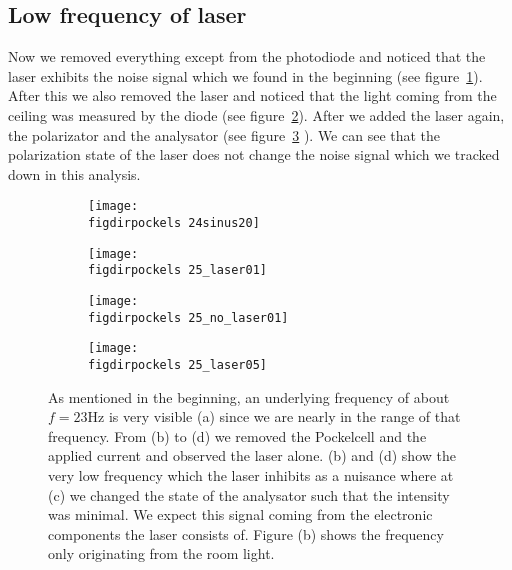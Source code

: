 \subsection{Low frequency of laser}\label{sec:laser}
Now we removed everything except from the photodiode and noticed that
the laser exhibits the noise signal which we found in the beginning
(see figure~\ref{fig:laser_a}). After this we also removed the
laser and noticed that the light coming from the ceiling was 
measured by the diode (see figure~\ref{fig:laser_b}).
After we added the laser again, the polarizator and the analysator
(see figure~\ref{fig:laser_f} ).
We can see that the polarization 
state of the laser does not change the noise signal which we 
tracked down in this analysis. 
\begin{figure}
    \begin{subfigure}[b]{\picwidth}
        \texttt{[image: \\figdirpockels 24sinus20]}
        \caption{}
    \end{subfigure}
    \begin{subfigure}[b]{\picwidth}
        \texttt{[image: \\figdirpockels 25\_laser01]}
        \caption{}
        \label{fig:laser_a}
    \end{subfigure}
    \begin{subfigure}[b]{\picwidth}
        \texttt{[image: \\figdirpockels 25\_no\_laser01]}
        \caption{}
        \label{fig:laser_b}
    \end{subfigure}
    \begin{subfigure}[b]{\picwidth}
        \texttt{[image: \\figdirpockels 25\_laser05]}
        \caption{}
        \label{fig:laser_f}
    \end{subfigure}

    \caption{As mentioned in the beginning, an underlying
        frequency of about $f=23$Hz is very visible (a) since 
            we are nearly in the range of that frequency.
        From (b) to (d) we removed the Pockelcell and the applied current and observed
        the laser alone.
        (b) and (d) show the very low frequency which
        the laser inhibits as a nuisance where at (c) we changed the state of the analysator
        such that the intensity was minimal. We expect this signal coming from the electronic components
        the laser consists of. Figure (b) shows the frequency only originating from the room light.
        }
    \label{fig:laser}
\end{figure}
\clearpage

